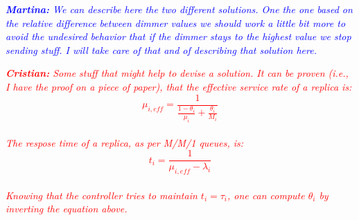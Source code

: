\textcolor{blue}{\textit{\textbf{Martina:} We can describe here the
    two different solutions. One the one based on the relative
    difference between dimmer values we should work a little bit more
    to avoid the undesired behavior that if the dimmer stays to the
    highest value we stop sending stuff. I will take care of that and
    of describing that solution here.}}

\textcolor{red}{\textit{\textbf{Cristian:} Some stuff that might help
    to devise a solution. It can be proven (i.e., I have the proof on
    a piece of paper), that the effective service rate of a replica
    is: $$\mu_{i,eff}=\frac{1}{\frac{1-\theta_i}{\mu_i}+\frac{\theta_i}{M_i}}$$
    \\
    The respose time of a replica, as per M/M/1 queues, is:
    \\
    $$t_i=\frac{1}{\mu_{i,eff}-\lambda_i}$$
    \\
    Knowing that the controller tries to maintain $t_i=\tau_i$, one
    can compute $\theta_i$ by inverting the equation above.}}
